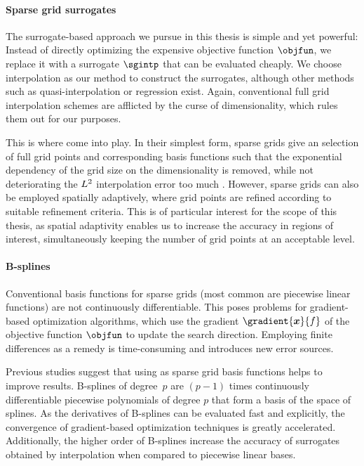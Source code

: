 \paragraph{Sparse grid surrogates}

The surrogate-based approach we pursue in this thesis is simple and
yet powerful:
Instead of directly optimizing the expensive objective function $\objfun$,
we replace it with a surrogate $\sgintp$ that can be evaluated cheaply.
We choose interpolation as our method to construct the surrogates,
although other methods such as quasi-interpolation
\cite{Hoellig13Approximation} or regression \cite{Pflueger10Spatially} exist.
Again, conventional full grid interpolation schemes are afflicted by the
curse of dimensionality, which rules them out for our purposes.

This is where  come into play.
In their simplest form, sparse grids give an  selection of
full grid points and corresponding basis functions such that
the exponential dependency of the grid size on the dimensionality
is removed, while not deteriorating the $L^2$ interpolation error too much
\cite{Bungartz04Sparse}.
However, sparse grids can also be employed spatially adaptively,
where grid points are refined  according to suitable
refinement criteria.
This is of particular interest for the scope of this thesis,
as spatial adaptivity enables us to increase the
accuracy in regions of interest,
simultaneously keeping the number of grid points at an acceptable level.

\paragraph{B-splines}

Conventional basis functions for sparse grids
(most common are piecewise linear functions)
are not continuously differentiable.
This poses problems for gradient-based optimization algorithms,
which use the gradient $\gradient{\*x}{f}$ of the
objective function $\objfun$ to update the search direction.
Employing finite differences as a remedy
is time-consuming and introduces new error sources.

Previous studies
suggest that using 
as sparse grid basis functions helps to improve results.
B-splines of degree~$p$ are $(p-1)$ times continuously differentiable
piecewise polynomials of degree $p$ that form a basis of the space of splines.
As the derivatives of B-splines can be evaluated fast and explicitly,
the convergence of gradient-based optimization techniques is
greatly accelerated.
Additionally, the higher order of B-splines increase the accuracy
of surrogates obtained by interpolation
when compared to piecewise linear bases.

